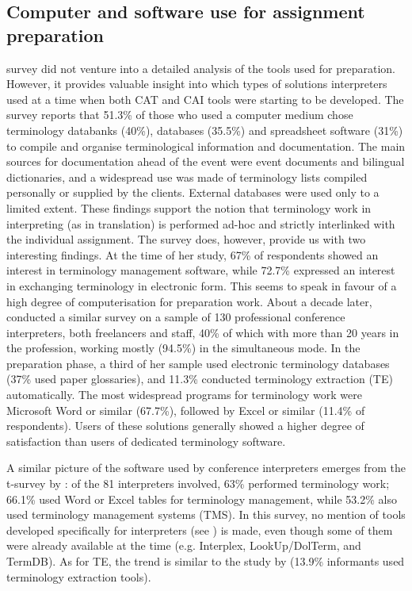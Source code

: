 \subsection{Computer and software use for assignment preparation} \label{pc_prep}
 survey did not venture into a detailed analysis of the tools used for preparation. However, it provides valuable insight into which types of solutions interpreters used at a time when both CAT and CAI tools were starting to be developed. The survey reports that 51.3\% of those who used a computer medium chose terminology databanks (40\%), databases (35.5\%) and spreadsheet software (31\%) to compile and organise terminological information and documentation. The main sources for documentation ahead of the event were event documents and bilingual dictionaries, and a widespread use was made of terminology lists compiled personally or supplied by the clients. External databases were used only to a limited extent. These findings support the notion that terminology work in interpreting (as in translation) is performed ad-hoc and strictly interlinked with the individual assignment. The survey does, however, provide us with two interesting findings. At the time of her study, 67\% of respondents showed an interest in terminology management software, while 72.7\% expressed an interest in exchanging terminology in electronic form. This seems to speak in favour of a high degree of computerisation for preparation work. About a decade later, \citet{valentini_uso_2001,valentini_uso_2002} conducted a similar survey on a sample of 130 professional conference interpreters, both freelancers and staff, 40\% of which with more than 20 years in the profession, working mostly (94.5\%) in the simultaneous mode. In the preparation phase, a third of her sample used electronic terminology databases (37\% used paper glossaries), and 11.3\% conducted terminology extraction (TE) automatically. The most widespread programs for terminology work were Microsoft Word or similar (67.7\%), followed by Excel or similar (11.4\% of respondents). Users of these solutions generally showed a higher degree of satisfaction than users of dedicated terminology software.

A similar picture of the software used by conference interpreters emerges from the t-survey by \citet{zielinski_forschung_2005}: of the 81 interpreters involved, 63\% performed terminology work; 66.1\% used Word or Excel tables for terminology management, while 53.2\% also used terminology management systems (TMS). In this survey, no mention of tools developed specifically for interpreters (see ) is made, even though some of them were already available at the time (e.g. Interplex, LookUp/DolTerm, and TermDB). As for TE, the trend is similar to the study by \citet{valentini_uso_2001,valentini_uso_2002} (13.9\% informants used terminology extraction tools).

